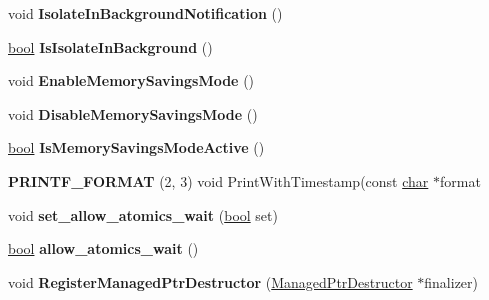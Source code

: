 \begin{DoxyCompactItemize}
void {\bfseries Isolate\+In\+Background\+Notification} ()
\item 
\mbox{\label{classv8_1_1internal_1_1Isolate_a39aec4ff4fe1896414abd4c9deaaf645}} 
\mbox{\hyperlink{classbool}{bool}} {\bfseries Is\+Isolate\+In\+Background} ()
\item 
\mbox{\label{classv8_1_1internal_1_1Isolate_a40de578d142c499326fc17957eb15039}} 
void {\bfseries Enable\+Memory\+Savings\+Mode} ()
\item 
\mbox{\label{classv8_1_1internal_1_1Isolate_a6b39cd28df360c2513e84ee9b4726f50}} 
void {\bfseries Disable\+Memory\+Savings\+Mode} ()
\item 
\mbox{\label{classv8_1_1internal_1_1Isolate_aa15fa3502e87693e6c8edcb26c9e3b3d}} 
\mbox{\hyperlink{classbool}{bool}} {\bfseries Is\+Memory\+Savings\+Mode\+Active} ()
\item 
\mbox{\label{classv8_1_1internal_1_1Isolate_a20fcbb9089b098be8e41b0cba01596c9}} 
{\bfseries P\+R\+I\+N\+T\+F\+\_\+\+F\+O\+R\+M\+AT} (2, 3) void Print\+With\+Timestamp(const \mbox{\hyperlink{classchar}{char}} $\ast$format
\item 
\mbox{\label{classv8_1_1internal_1_1Isolate_ac92f391d03eb799eec4aa86ae80b9178}} 
void {\bfseries set\+\_\+allow\+\_\+atomics\+\_\+wait} (\mbox{\hyperlink{classbool}{bool}} set)
\item 
\mbox{\label{classv8_1_1internal_1_1Isolate_aff756defc716556bf7e668b56b713bdb}} 
\mbox{\hyperlink{classbool}{bool}} {\bfseries allow\+\_\+atomics\+\_\+wait} ()
\item 
\mbox{\label{classv8_1_1internal_1_1Isolate_a929710153202a48655744e5e279569b3}} 
void {\bfseries Register\+Managed\+Ptr\+Destructor} (\mbox{\hyperlink{structv8_1_1internal_1_1ManagedPtrDestructor}{Managed\+Ptr\+Destructor}} $\ast$finalizer)
\item 
\mbox{\label{classv8_1_1internal_1_1Isolate_a7e164366b1788e912c87dbadbfbdbdb8}} 

\end{DoxyCompactItemize}
